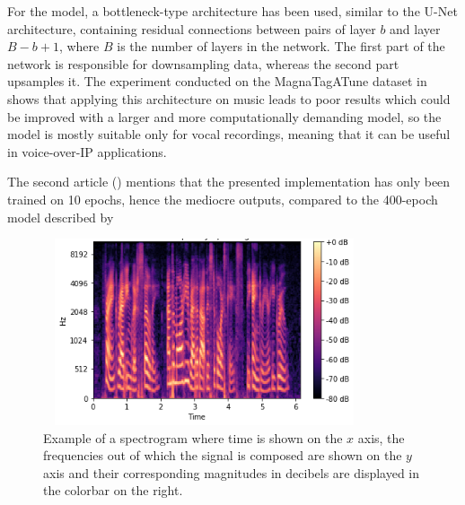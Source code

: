 \documentclass[conference]{IEEEtran}
\begin{document}
	For the model, a bottleneck-type architecture has been used, similar to the U-Net architecture, containing residual connections between pairs of layer $ b $ and layer $ B - b + 1 $, where $ B $ is the number of layers in the network. The first part of the network is responsible for downsampling data, whereas the second part upsamples it. The experiment conducted on the MagnaTagATune dataset in \textcite{kuleshov2017audio} shows that applying this architecture on music leads to poor results which could be improved with a larger and more computationally demanding model, so the model is mostly suitable only for vocal recordings, meaning that it can be useful in voice-over-IP applications.

	The second article (\textcite{hetherly2017audio}) mentions that the presented implementation has only been trained on 10 epochs, hence the mediocre outputs, compared to the 400-epoch model described by \textcite{kuleshov2017audio}

	
\begin{figure}[htbp]
		\centerline{\includegraphics[width=9.5cm,height=5.5cm]{spectrogram.png}}
\caption{Example of a spectrogram where time is shown on the $ x $ axis, the frequencies out of which the signal is composed are shown on the $ y $ axis and their corresponding magnitudes in decibels are displayed in the colorbar on the right.}
\label{fig}
\end{figure}



		
\printbibliography
\vspace{12pt}
\end{document}
